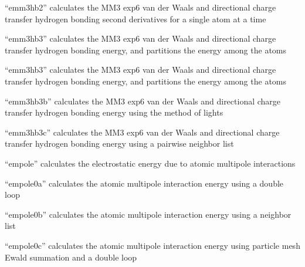 \documentclass[letterpaper,11pt,english]{sphinxmanual}
\begin{document}
\sphinxAtStartPar
{}

\sphinxAtStartPar
“emm3hb2” calculates the MM3 exp\sphinxhyphen{}6 van der Waals and directional charge transfer hydrogen bonding second derivatives for a single atom at a time

\sphinxAtStartPar
{}

\sphinxAtStartPar
“emm3hb3” calculates the MM3 exp\sphinxhyphen{}6 van der Waals and directional charge transfer hydrogen bonding energy, and partitions the energy among the atoms

\sphinxAtStartPar
{}

\sphinxAtStartPar
“emm3hb3” calculates the MM3 exp\sphinxhyphen{}6 van der Waals and directional charge transfer hydrogen bonding energy, and partitions the energy among the atoms

\sphinxAtStartPar
{}

\sphinxAtStartPar
“emm3hb3b” calculates the MM3 exp\sphinxhyphen{}6 van der Waals and directional charge transfer hydrogen bonding energy using the method of lights

\sphinxAtStartPar
{}

\sphinxAtStartPar
“emm3hb3c” calculates the MM3 exp\sphinxhyphen{}6 van der Waals and directional charge transfer hydrogen bonding energy using a pairwise neighbor list

\sphinxAtStartPar
{}

\sphinxAtStartPar
“empole” calculates the electrostatic energy due to atomic multipole interactions

\sphinxAtStartPar
{}

\sphinxAtStartPar
“empole0a” calculates the atomic multipole interaction energy using a double loop

\sphinxAtStartPar
{}

\sphinxAtStartPar
“empole0b” calculates the atomic multipole interaction energy using a neighbor list

\sphinxAtStartPar
{}

\sphinxAtStartPar
“empole0c” calculates the atomic multipole interaction energy using particle mesh Ewald summation and a double loop

\sphinxAtStartPar
{}
\end{document}
